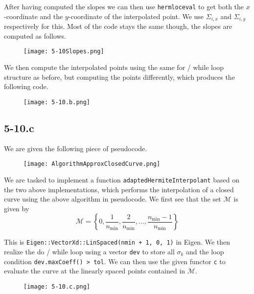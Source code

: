 \documentclass{article}
\begin{document}
\noindent After having computed the slopes  we can then use \verb|hermloceval| to get both the $x$-coordinate and the $y$-coordinate of the interpolated point. We use $\Sigma_{i, x}$ and $\Sigma_{i, y}$ respectively for this. Most of the code stays the same though, the slopes are computed as follows. 

\begin{figure}[!hbt]
    \centering
\texttt{[image: 5-10Slopes.png]}
\end{figure}

\pagebreak

\noindent We then compute the interpolated points using the same for / while loop structure as before, but computing the points differently, which produces the following code.

\begin{figure}[!hbt]
    \centering
\texttt{[image: 5-10.b.png]}
\end{figure}

\subsection*{5-10.c}
We are given the following piece of pseudocode.

\begin{figure}[!hbt]
    \centering
\texttt{[image: AlgorithmApproxClosedCurve.png]}
\end{figure}

\noindent We are tasked to implement a function \verb|adaptedHermiteInterpolant| based on the two above implementations, which performs the interpolation of a closed curve using the above algorithm in pseudocode. We first see that the set $\mathcal{M}$ is given by 
\begin{equation*}
    \mathcal{M} = \left\{0, \frac{1}{n_{\text{min}}}, \frac{2}{n_{\text{min}}}, \dots, \frac{n_{\text{min}} - 1}{n_{\text{min}}}\right\}
\end{equation*}

\noindent This is \verb|Eigen::VectorXd::LinSpaced(nmin + 1, 0, 1)| in Eigen. We then realize the do / while loop using a vector \verb|dev| to store all $\sigma_{k}$ and the loop condition \verb|dev.maxCoeff() > tol|. We can then use the given functor \verb|c| to evaluate the curve at the linearly spaced points contained in $\mathcal{M}$.

\begin{figure}[!hbt]
    \centering
\texttt{[image: 5-10.c.png]}
\end{figure}
\end{document}
